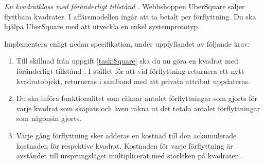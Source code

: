 \Task \emph{En kvadratklass med föränderligt tillstånd .} Webbshoppen UberSquare säljer flyttbara kvadrater. I affärsmodellen ingår att ta betalt per förflyttning. Du ska hjälpa UberSquare med att utveckla en enkel systemprototyp.

\Subtask Implementera  enligt nedan specifikation, under uppfyllandet av följande krav:

\begin{enumerate}
\item Till skillnad från uppgift \ref{task:Square} ska du nu göra en kvadrat med föränderligt tillstånd . I stället för att vid förflyttning returnera ett nytt kvadratobjekt, returneras  i samband med att privata attribut uppdateras.
\item Du ska införa funktionalitet som räknar antalet förflyttningar som gjorts för varje kvadrat som skapats och även räkna ut det totala antalet förflyttningar som någonsin gjorts.
\item Varje gång förflyttning sker adderas en kostnad till den ackumulerade kostnaden för respektive kvadrat. Kostnaden för varje förflyttning är avståndet till ursprungsläget multiplicerat med storleken på kvadraten.
\end{enumerate}

